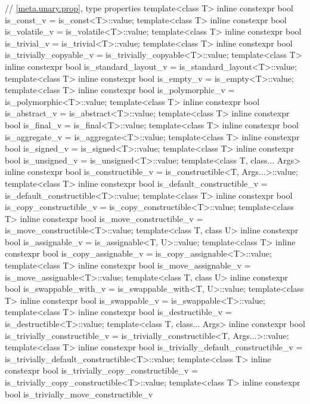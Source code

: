 \begin{codeblock}
{  // \ref{meta.unary.prop}, type properties
  template<class T>
    inline constexpr bool is_const_v = is_const<T>::value;
  template<class T>
    inline constexpr bool is_volatile_v = is_volatile<T>::value;
  template<class T>
    inline constexpr bool is_trivial_v = is_trivial<T>::value;
  template<class T>
    inline constexpr bool is_trivially_copyable_v = is_trivially_copyable<T>::value;
  template<class T>
    inline constexpr bool is_standard_layout_v = is_standard_layout<T>::value;
  template<class T>
    inline constexpr bool is_empty_v = is_empty<T>::value;
  template<class T>
    inline constexpr bool is_polymorphic_v = is_polymorphic<T>::value;
  template<class T>
    inline constexpr bool is_abstract_v = is_abstract<T>::value;
  template<class T>
    inline constexpr bool is_final_v = is_final<T>::value;
  template<class T>
    inline constexpr bool is_aggregate_v = is_aggregate<T>::value;
  template<class T>
    inline constexpr bool is_signed_v = is_signed<T>::value;
  template<class T>
    inline constexpr bool is_unsigned_v = is_unsigned<T>::value;
  template<class T, class... Args>
    inline constexpr bool is_constructible_v = is_constructible<T, Args...>::value;
  template<class T>
    inline constexpr bool is_default_constructible_v = is_default_constructible<T>::value;
  template<class T>
    inline constexpr bool is_copy_constructible_v = is_copy_constructible<T>::value;
  template<class T>
    inline constexpr bool is_move_constructible_v = is_move_constructible<T>::value;
  template<class T, class U>
    inline constexpr bool is_assignable_v = is_assignable<T, U>::value;
  template<class T>
    inline constexpr bool is_copy_assignable_v = is_copy_assignable<T>::value;
  template<class T>
    inline constexpr bool is_move_assignable_v = is_move_assignable<T>::value;
  template<class T, class U>
    inline constexpr bool is_swappable_with_v = is_swappable_with<T, U>::value;
  template<class T>
    inline constexpr bool is_swappable_v = is_swappable<T>::value;
  template<class T>
    inline constexpr bool is_destructible_v = is_destructible<T>::value;
  template<class T, class... Args>
    inline constexpr bool is_trivially_constructible_v
      = is_trivially_constructible<T, Args...>::value;
  template<class T>
    inline constexpr bool is_trivially_default_constructible_v
      = is_trivially_default_constructible<T>::value;
  template<class T>
    inline constexpr bool is_trivially_copy_constructible_v
      = is_trivially_copy_constructible<T>::value;
  template<class T>
    inline constexpr bool is_trivially_move_constructible_v
}
\end{codeblock}
